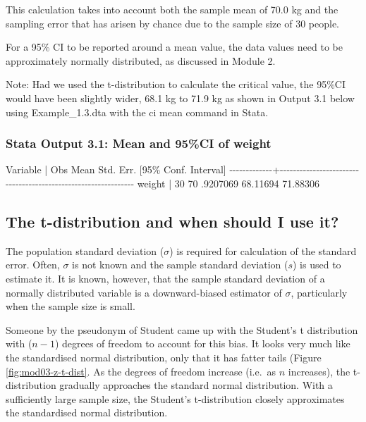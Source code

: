 \documentclass[
]{memoir}
\newenvironment{Shaded}{\begin{snugshade}}{\end{snugshade}}
\newcommand{\NormalTok}[1]{#1}
\begin{document}
This calculation takes into account both the sample mean of 70.0 kg and the sampling error that has arisen by chance due to the sample size of 30 people.

For a 95\% CI to be reported around a mean value, the data values need to be approximately normally distributed, as discussed in Module 2.

Note: Had we used the t-distribution to calculate the critical value, the 95\%CI would have been slightly wider, 68.1 kg to 71.9 kg as shown in Output 3.1 below using Example\_1.3.dta with the ci mean command in Stata.

\hypertarget{stata-output-3.1-mean-and-95ci-of-weight}{%
\subsubsection*{Stata Output 3.1: Mean and 95\%CI of weight}\label{stata-output-3.1-mean-and-95ci-of-weight}}

\begin{Shaded}
\begin{Highlighting}[]
\NormalTok{    Variable |        Obs        Mean    Std. Err.       [95\% Conf. Interval]}
\NormalTok{{-}{-}{-}{-}{-}{-}{-}{-}{-}{-}{-}{-}{-}+{-}{-}{-}{-}{-}{-}{-}{-}{-}{-}{-}{-}{-}{-}{-}{-}{-}{-}{-}{-}{-}{-}{-}{-}{-}{-}{-}{-}{-}{-}{-}{-}{-}{-}{-}{-}{-}{-}{-}{-}{-}{-}{-}{-}{-}{-}{-}{-}{-}{-}{-}{-}{-}{-}{-}{-}{-}{-}{-}{-}{-}{-}{-}}
\NormalTok{      weight |         30          70    .9207069        68.11694    71.88306}
\end{Highlighting}
\end{Shaded}

\hypertarget{the-t-distribution-and-when-should-i-use-it}{%
\subsection{The t-distribution and when should I use it?}\label{the-t-distribution-and-when-should-i-use-it}}

The population standard deviation (\(\sigma\)) is required for calculation of the standard error. Often, \(\sigma\) is not known and the sample standard deviation (\(s\)) is used to estimate it. It is known, however, that the sample standard deviation of a normally distributed variable is a downward-biased estimator of \(\sigma\), particularly when the sample size is small.

Someone by the pseudonym of Student came up with the Student's t distribution with (\(n-1\)) degrees of freedom to account for this bias. It looks very much like the standardised normal distribution, only that it has fatter tails (Figure \ref{fig:mod03-z-t-dist}. As the degrees of freedom increase (i.e.~as \(n\) increases), the t-distribution gradually approaches the standard normal distribution. With a sufficiently large sample size, the Student's t-distribution closely approximates the standardised normal distribution.
\end{document}

